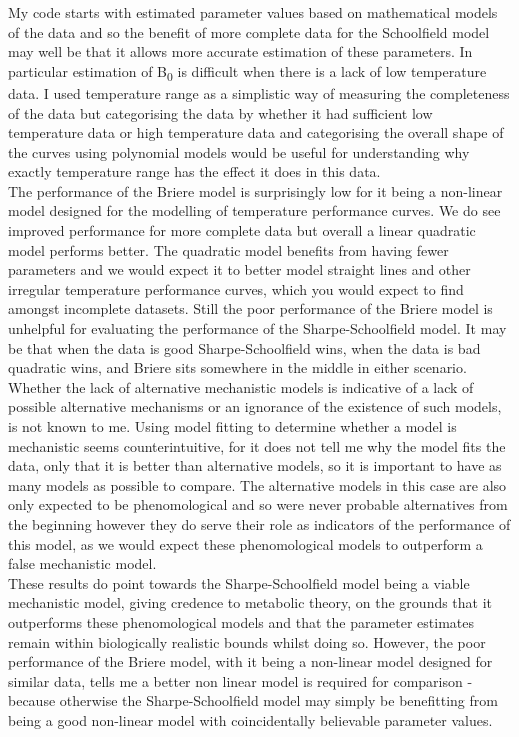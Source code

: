 \documentclass[12pt]{article}\usepackage[]{graphicx}\usepackage[]{color}
\begin{document}
  My code starts with estimated parameter values based on mathematical models of the data and 
  so the benefit of more complete data for the Schoolfield model may well be that it allows more 
  accurate estimation of these parameters. In particular estimation of B\textsubscript{0} is 
  difficult when there is a lack of low temperature data. I used temperature range as a simplistic way of measuring
  the completeness of the data but categorising the data by whether it had sufficient low temperature data or high temperature data 
  and categorising the overall shape of the curves using polynomial models would be useful for understanding why exactly temperature 
  range has the effect it does in this data.\\
  The performance of the Briere model is surprisingly low for it being a non-linear model designed
  for the modelling of temperature performance curves. We do see improved performance for more complete data but overall 
  a linear quadratic model performs better. The quadratic model benefits from having fewer parameters and 
  we would expect it to better model straight lines and other irregular temperature performance curves, 
  which you would expect to find amongst incomplete datasets. Still the poor performance of the Briere model is unhelpful for evaluating the performance of the 
  Sharpe-Schoolfield model. It may be that when the data is good Sharpe-Schoolfield wins, when the data is bad quadratic wins, 
  and Briere sits somewhere in the middle in either scenario.\\
  Whether the lack of alternative mechanistic models is indicative of a lack of possible alternative mechanisms 
  or an ignorance of the existence of such models, is not known to me. Using model fitting to determine whether a 
  model is mechanistic seems counterintuitive, for it does not tell me why the model fits the data, only that 
  it is better than alternative models, so it is important to have as many models as possible to compare. The alternative models 
  in this case are also only expected to be phenomological
  and so were never probable alternatives from the beginning however they do serve their role as indicators of the 
  performance of this model, as we would expect these phenomological models to outperform a false mechanistic model.\\
  These results do point towards the Sharpe-Schoolfield model being a viable mechanistic model, giving credence
  to metabolic theory, on the grounds that it outperforms 
  these phenomological models and that the parameter estimates remain within biologically realistic bounds whilst doing so. 
  However, the poor performance of the Briere model, with it being a non-linear 
  model designed for similar data, tells me a better non linear model is required for comparison - because otherwise 
  the Sharpe-Schoolfield model may simply be benefitting from being a good non-linear model with coincidentally believable 
  parameter values. 


  
  
\end{document}
